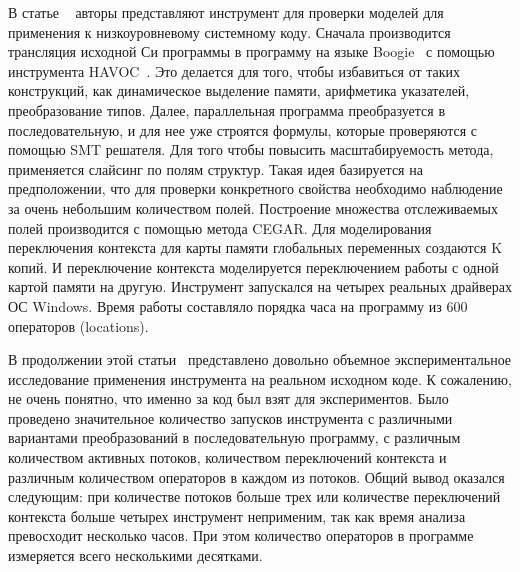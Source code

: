 В статье ~\cite{Lahiri:2009} авторы представляют инструмент для проверки моделей для применения к низкоуровневому системному коду.
Сначала производится трансляция исходной Си программы в программу на языке Boogie~\cite{boogiePL} с помощью инструмента HAVOC~\cite{Chatterjee:2007}.
Это делается для того, чтобы избавиться от таких конструкций, как динамическое выделение памяти, арифметика указателей, преобразование типов. Далее, параллельная программа преобразуется в последовательную, и для нее уже строятся формулы, которые проверяются с помощью SMT решателя.
Для того чтобы повысить масштабируемость метода, применяется слайсинг по полям структур.
Такая идея базируется на предположении, что для проверки конкретного свойства необходимо наблюдение за очень небольшим количеством полей.
Построение множества отслеживаемых полей производится с помощью метода CEGAR. 
Для моделирования переключения контекста для карты памяти глобальных переменных создаются K копий. И переключение контекста моделируется переключением работы с одной картой памяти на другую.
Инструмент запускался на четырех реальных драйверах ОС Windows.
Время работы составляло порядка часа на программу из 600 операторов (locations). 

В продолжении этой статьи~\cite{Ghafari:2010} представлено довольно объемное экспериментальное исследование применения инструмента на реальном исходном коде.
К сожалению, не очень понятно, что именно за код был взят для экспериментов.
Было проведено значительное количество запусков инструмента с различными вариантами преобразований в последовательную программу, с различным количеством активных потоков, количеством переключений контекста и различным количеством операторов в каждом из потоков.
Общий вывод оказался следующим: при количестве потоков больше трех или количестве переключений контекста больше четырех инструмент неприменим, так как время анализа превосходит несколько часов.
При этом количество операторов в программе измеряется всего несколькими десятками.

